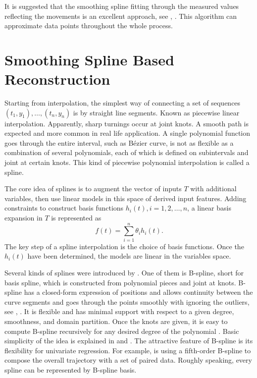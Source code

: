 It is suggested that the smoothing spline fitting through the measured values reflecting the movements is an excellent approach, see \cite{eubank2004simple}, \cite{durbin2012time}. This algorithm can approximate data points throughout the whole process. 


\section{Smoothing Spline Based Reconstruction}


Starting from interpolation, the simplest way of connecting a set of sequences $(t_1,y_1),\ldots, (t_n,y_n)$ is by straight line segments. Known as piecewise linear interpolation. Apparently, sharp turnings occur at joint knots. A smooth path is expected and more common in real life application. A single polynomial function goes through the entire interval, such as B\'ezier curve, is not as flexible as a combination of several polynomials, each of which is defined on subintervals and joint at certain knots. This kind of piecewise polynomial interpolation is called a spline. 

The core idea of splines is to augment the vector of inputs $T$ with additional variables, then use linear models in this space of derived input features. Adding constraints to construct basis functions $h_i(t), i = 1, 2,\ldots, n$, a linear basis expansion in $T$ is represented as
\begin{equation*}
f(t)=\sum_{i=1}^n \theta_i h_i(t).
\end{equation*}
The key step of a spline interpolation is the choice of basis functions. Once the $h_i(t)$ have been determined, the models are linear in the variables space. 

Several kinds of splines were introduced by \cite{esl2009}. One of them is B-spline, short for basis spline, which is constructed from polynomial pieces and joint at knots. B-spline has a closed-form expression of positions and allows continuity between the curve segments and goes through the points smoothly with ignoring the outliers, see \eg \cite{komoriya1989trajectory}, \cite{ben2004geometric}. It is flexible and has minimal support with respect to a given degree, smoothness, and domain partition. Once the knots are given, it is easy to compute B-spline recursively for any desired degree of the polynomial \cite{de1978practical} \cite{cox1982practical}. Basic simplicity of the idea is explained in \cite{dierckx1995curve} and \cite{eilers1996flexible}. The attractive feature of B-spline is its flexibility for univariate regression. For example,  \cite{gasparetto2007new} is using a fifth-order B-spline to compose the overall trajectory with a set of paired data. Roughly speaking, every spline can be represented by B-spline basis. 

